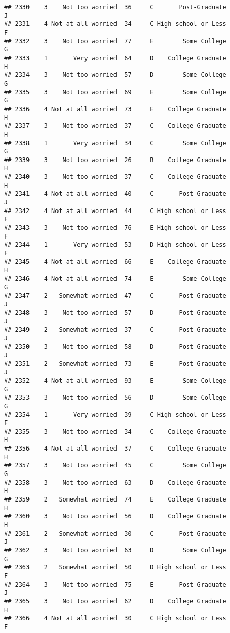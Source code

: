 \documentclass[
]{article}
\begin{document}
\begin{verbatim}
## 2330    3    Not too worried  36     C       Post-Graduate         J
## 2331    4 Not at all worried  34     C High school or Less         F
## 2332    3    Not too worried  77     E        Some College         G
## 2333    1       Very worried  64     D    College Graduate         H
## 2334    3    Not too worried  57     D        Some College         G
## 2335    3    Not too worried  69     E        Some College         G
## 2336    4 Not at all worried  73     E    College Graduate         H
## 2337    3    Not too worried  37     C    College Graduate         H
## 2338    1       Very worried  34     C        Some College         G
## 2339    3    Not too worried  26     B    College Graduate         H
## 2340    3    Not too worried  37     C    College Graduate         H
## 2341    4 Not at all worried  40     C       Post-Graduate         J
## 2342    4 Not at all worried  44     C High school or Less         F
## 2343    3    Not too worried  76     E High school or Less         F
## 2344    1       Very worried  53     D High school or Less         F
## 2345    4 Not at all worried  66     E    College Graduate         H
## 2346    4 Not at all worried  74     E        Some College         G
## 2347    2   Somewhat worried  47     C       Post-Graduate         J
## 2348    3    Not too worried  57     D       Post-Graduate         J
## 2349    2   Somewhat worried  37     C       Post-Graduate         J
## 2350    3    Not too worried  58     D       Post-Graduate         J
## 2351    2   Somewhat worried  73     E       Post-Graduate         J
## 2352    4 Not at all worried  93     E        Some College         G
## 2353    3    Not too worried  56     D        Some College         G
## 2354    1       Very worried  39     C High school or Less         F
## 2355    3    Not too worried  34     C    College Graduate         H
## 2356    4 Not at all worried  37     C    College Graduate         H
## 2357    3    Not too worried  45     C        Some College         G
## 2358    3    Not too worried  63     D    College Graduate         H
## 2359    2   Somewhat worried  74     E    College Graduate         H
## 2360    3    Not too worried  56     D    College Graduate         H
## 2361    2   Somewhat worried  30     C       Post-Graduate         J
## 2362    3    Not too worried  63     D        Some College         G
## 2363    2   Somewhat worried  50     D High school or Less         F
## 2364    3    Not too worried  75     E       Post-Graduate         J
## 2365    3    Not too worried  62     D    College Graduate         H
## 2366    4 Not at all worried  30     C High school or Less         F

\end{verbatim}
\end{document}
